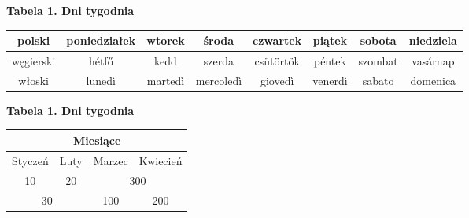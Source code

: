 \documentclass{article}
\begin{document}
	\begin{center}
	\textbf{Tabela 1. Dni tygodnia}
	\begin{tabular}{| c | c | c | c | c | c | c | c |}
		\hline
		polski & poniedziałek & wtorek & środa & czwartek & piątek & sobota & niedziela \\
		\hline
		węgierski & hétfő & kedd & szerda & csütörtök & péntek & szombat & vasárnap \\
		\hline
		włoski & lunedì & martedì & mercoledì & giovedì & venerdì & sabato & domenica \\
		\hline
	\end{tabular}
	\newline
	\vspace*{5 mm}
	\newline
	\textbf{Tabela 1. Dni tygodnia} \\
	\begin{tabular}{| c | c | c | c |}
		\hline
		\multicolumn{4}{|c|}{Miesiące} 			\\ \hline
		Styczeń & Luty & Marzec & Kwiecień 		\\ \hline
		10 & 20 & \multicolumn{2}{c|}{300} 		\\ \hline
		\multicolumn{2}{|c|}{30} & 100 & 200 	\\ \hline
	\end{tabular}
	\end{center}
\end{document}
